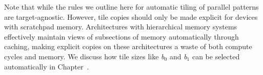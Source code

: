 Note that while the rules we outline here for automatic tiling of parallel patterns are
target-agnostic. However, tile copies should only be made explicit for devices
with scratchpad memory. Architectures with hierarchical memory systems
effectively maintain views of subsections of memory automatically through
caching, making explicit copies on these architectures a waste of both
compute cycles and memory. We discuss how tile sizes like \emph{b$_0$} and
\emph{b$_1$} can be selected automatically in Chapter~.
